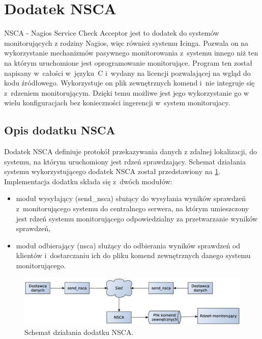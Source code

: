 \section[Dodatek NSCA][Dodatek NSCA]{Dodatek NSCA}
\label{sec:NSCA}

NSCA - Nagios Service Check Acceptor jest to dodatek do systemów
monitorujących z rodziny Nagios, więc również systemu Icinga. Pozwala
on na wykorzystanie mechanizmów pasywnego monitorowania z~systemu
innego niż ten na którym uruchomione jest oprogramowanie
monitorujące. Program ten został napisany w~całości w~języku~C
i~wydany na licencji pozwalającej na wgląd do kodu
źródłowego. Wykorzystuje on plik zewnętrznych komend i~nie integruje
się z~rdzeniem monitorującym. Dzięki temu możliwe jest jego
wykorzystanie go w wielu konfiguracjach bez konieczności ingerencji
w~system monitorujacy.

\subsection[Opis dodatku NSCA][Opis dodatku NSCA]{Opis dodatku NSCA}

Dodatek NSCA definiuje protokół przekazywania danych z zdalnej
lokalizacji, do systemu, na którym uruchomiony jest rdzeń
sprawdzający. Schemat działania systemu wykorzystującego dodatek NSCA
został przedstawiony na \ref{fig:nsca}. Implementacja dodatku składa
się z~dwóch modułów:

\begin{itemize}
\item moduł wysyłający (send\_nsca) służący do wysyłania wyników
  sprawdzeń z~monitorującego systemu do centralnego serwera, na którym
  umieszczony jest rdzeń systemu monitorującego odpowiedzialny za
  przetwarzanie wyników sprawdzeń,
\item moduł odbierający (nsca) służący do odbierania wyników sprawdzeń
  od klientów i~dostarczaniu ich do pliku komend zewnętrznych danego
  systemu monitorującego.
\end{itemize}

\begin{figure}[ht]
  \caption{Schemat działania dodatku NSCA.}
  \label{fig:nsca}
\includegraphics[width=1\textwidth]{img/nsca}
\end{figure}

